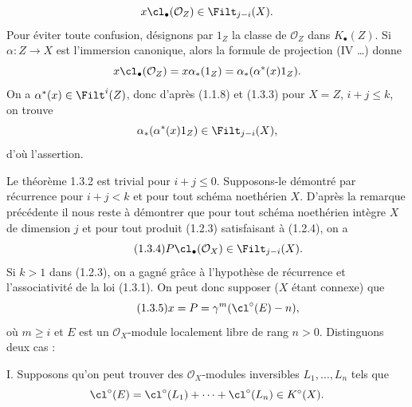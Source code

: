 \[
x\cl_\bullet(\mathcal O_Z)\in\Filt_{j-i}(X).
\]
Pour éviter toute confusion, désignons par $1_Z$ la classe de $\mathcal O_Z$ dans $K_\bullet(Z)$. Si $\alpha:Z\to X$ est l'immersion canonique, alors la formule de projection (IV \ldots) donne
\[
x\cl_\bullet(\mathcal O_Z)=x\alpha_*(1_Z)=\alpha_*(\alpha^*(x)1_Z).
\]
On a $\alpha^*(x)\in\Filt^i(Z)$, donc d'après (1.1.8) et (1.3.3) pour $X=Z$, $i+j\leq k$, on trouve
\[
\alpha_*(\alpha^*(x)1_Z)\in\Filt_{j-i}(X),
\]
d'où l'assertion.

Le théorème 1.3.2 est trivial pour $i+j\leq0$. Supposons-le démontré par récurrence pour $i+j<k$ et pour tout schéma noethérien $X$. D'après la remarque précédente il nous reste à démontrer que pour tout schéma noethérien intègre $X$ de dimension $j$ et pour tout produit (1.2.3) satisfaisant à (1.2.4), on a
\begin{equation}\tag{1.3.4}
P\cl_\bullet(\mathcal O_X)\in\Filt_{j-i}(X).
\end{equation}
Si $k>1$ dans (1.2.3), on a gagné grâce à l'hypothèse de récurrence et l'associativité de la loi (1.3.1). On peut donc supposer ($X$ étant connexe) que
\begin{equation}\tag{1.3.5}
x=P=\gamma^m(\cl^\circ(E)-n),
\end{equation}
où $m\geq i$ et $E$ est un $\mathcal O_X$-module localement libre de rang $n>0$. Distinguons deux cas :

I. Supposons qu'on peut trouver des $\mathcal O_X$-modules inversibles $L_1,\ldots,L_n$ tels que
\[
\cl^\circ(E)=\cl^\circ(L_1)+\cdots+\cl^\circ(L_n)\in K^\circ(X).
\]
